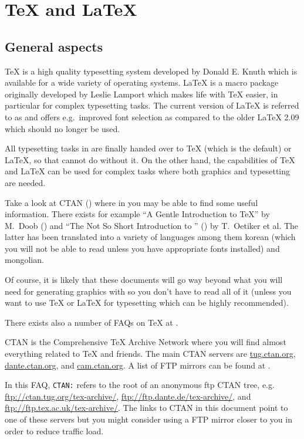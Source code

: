 \documentclass[11pt,DIV14]{scrartcl}
\begin{document}
\section{\TeX{} and \LaTeX{}}

\subsection{General aspects}

{}
{\label{q:what_is_tex}
\TeX{} is a high quality typesetting system developed by Donald E. Knuth 
which is available for a wide variety of operating systems. \LaTeX{} is a 
macro package originally developed by Leslie Lamport which makes life with 
\TeX{} easier, in particular for complex typesetting tasks. The current 
version of \LaTeX{} is referred to as \LaTeXe{} and offers e.g.\ improved 
font selection as compared to the older \LaTeX{} 2.09 which should no longer 
be used. 

All typesetting tasks in \PyX{} are finally handed over to \TeX{} (which is the
default) or \LaTeX{}, so that \PyX{} cannot do without it. On the other hand,
the capabilities of \TeX{} and \LaTeX{} can be used for complex tasks where
both graphics and typesetting are needed.
}

{}
{\label{q:intro_tex_latex}
Take a look at CTAN () where in 
you may be able to find some useful information. There exists for example 
``A Gentle Introduction to \TeX'' by M.~Doob () and
``The Not So Short Introduction to \LaTeXe'' 
() by T.~Oetiker et al. The latter has
been translated into a variety of languages among them korean (which you will
not be able to read unless you have appropriate fonts installed) and mongolian.

Of course, it is likely that these documents will go way beyond what you 
will need for generating graphics with \PyX{} so you don't have to read all
of it (unless you want to use \TeX{} or \LaTeX{} for typesetting which can be
highly recommended). 

There exists also a number of FAQs on \TeX{} at .
}

{}
{\label{q:ctan}
CTAN is the Comprehensive TeX Archive Network where you will find almost
everything related to \TeX{} and friends. The main CTAN servers are 
\url{tug.ctan.org}, \url{dante.ctan.org}, and \url{cam.ctan.org}. A list of 
FTP mirrors can be found at . 

In this FAQ, \texttt{CTAN:} refers to the root of an anonymous ftp CTAN tree, 
e.g.  \url{ftp://ctan.tug.org/tex-archive/}, 
\url{ftp://ftp.dante.de/tex-archive/},
and \url{ftp://ftp.tex.ac.uk/tex-archive/}. The links to CTAN in this document
point to one of these servers but you might consider using a FTP mirror closer
to you in order to reduce traffic load.
}
\end{document}
